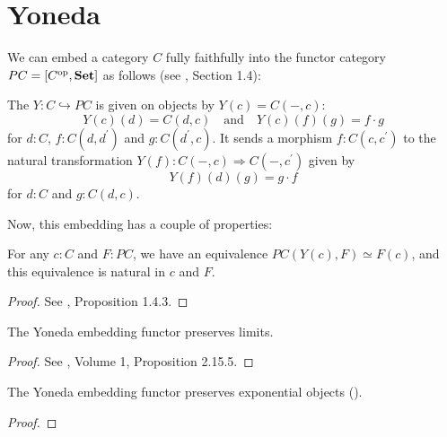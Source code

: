 \section{Yoneda}
We can embed a category $ C $ fully faithfully into the functor category $ P C = [C^{\text{op}}, \mathbf{Set}] $ as follows (see \autocite{Kashiwara}, Section 1.4):
\begin{definition}
  The  $ Y : C \hookrightarrow P C $ is given on objects by $ Y(c) = C(-, c) $:
  \[ Y(c)(d) = C(d, c) \quad \text{and} \quad Y(c)(f)(g) = f \cdot g \]
  for $ d: C $, $ f: C(d, d^\prime) $ and $ g: C(d^\prime, c) $. It sends a morphism $ f: C(c, c^\prime) $ to the natural transformation $ Y(f): C(-, c) \Rightarrow C(-, c^\prime) $ given by
  \[ Y(f)(d)(g) = g \cdot f \]
  for $ d: C $ and $ g: C(d, c) $.
\end{definition}

Now, this embedding has a couple of properties:
\begin{lemma}
  For any $ c: C $ and $ F : PC $, we have an equivalence $ PC(Y(c), F) \simeq F(c) $, and this equivalence is natural in $ c $ and $ F $.
\end{lemma}
\begin{proof}
  See \autocite{Kashiwara}, Proposition 1.4.3.
\end{proof}

\begin{lemma}
  The Yoneda embedding functor preserves limits.
\end{lemma}
\begin{proof}
  See \autocite{borceux}, Volume 1, Proposition 2.15.5.
\end{proof}

\begin{lemma}
  The Yoneda embedding functor preserves exponential objects (\autocite{stackexchange:yoneda-exponentials}).
\end{lemma}
\begin{proof}

\end{proof}

